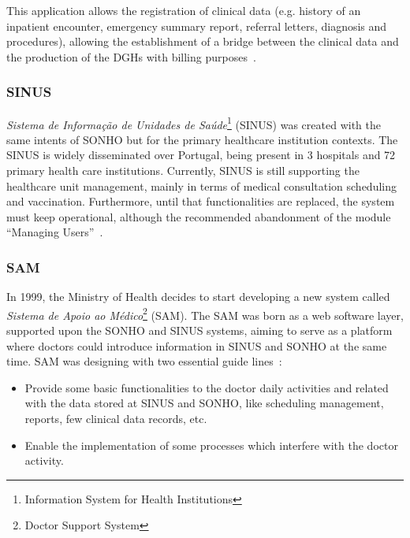 This application allows the registration of clinical data (e.g. history of an inpatient encounter, emergency summary report, referral letters, diagnosis and procedures), allowing the establishment of a bridge between the clinical data and the production of the DGHs with billing purposes~\citep{GDHSONHO2011}.



\subsubsection{SINUS}

\textit{Sistema de Informação de Unidades de Saúde}\footnote{Information System for Health Institutions} (SINUS) was created with the same intents of SONHO but for the primary healthcare institution contexts. The SINUS is widely disseminated over Portugal, being present in 3 hospitals and 72 primary health care institutions. Currently, SINUS is still supporting the healthcare unit management, mainly in terms of medical consultation scheduling and vaccination. Furthermore, until that functionalities are replaced, the system must keep operational, although the recommended abandonment of the module ``Managing Users''~\citep{Saude2010}.


\subsubsection{SAM}


In 1999, the Ministry of Health decides to start developing a new system called \textit{Sistema de Apoio ao Médico}\footnote{Doctor Support System} (SAM). The SAM was born as a web software layer, supported upon the SONHO and SINUS systems, aiming to serve as a platform where doctors could introduce information in SINUS and SONHO at the same time. SAM was designing with two essential guide lines~\citep{Castanheira2005, ACSS_SAM2010}:
\begin{itemize}
\item Provide some basic functionalities to the doctor daily activities and related with the data stored at SINUS and SONHO, like scheduling management, reports, few clinical data records, etc.
\item Enable the implementation of some processes which interfere with the doctor activity.
\end{itemize}


